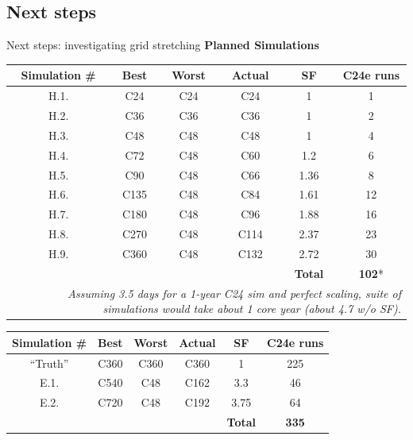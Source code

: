 \documentclass[10pt]{beamer}
\begin{document}
\subsection{Next steps}
\frame{\sectionpage}

\begin{frame}{Next steps: investigating grid stretching}
    \vspace{0.4cm}
    \footnotesize
    \textbf{Planned Simulations}
    \tiny
    \begin{table}[]
    \begin{tabular}{cccccc}
        \hline
        \textbf{Simulation \#} & \textbf{Best} & \textbf{Worst} &  \textbf{Actual} & \textbf{SF} & \textbf{C24e runs} \\ 
        \hline
        H.1. & C24 & C24 & C24 & 1 & 1  \\ 
        H.2. & C36 & C36 & C36 & 1 & 2  \\ 
        H.3. & C48 & C48 & C48 & 1 & 4  \\ 
        H.4. & C72 & C48 & C60 & 1.2 & 6  \\ 
        H.5. & C90 & C48 & C66 & 1.36 & 8  \\ 
        H.6. & C135 & C48 & C84 & 1.61 & 12  \\ 
        H.7. & C180 & C48 & C96 & 1.88 & 16  \\ 
        H.8. & C270 & C48 & C114 & 2.37 & 23  \\ 
        H.9. & C360 & C48 & C132 & 2.72 & 30  \\ 
        \hline
         &  &  & & \textbf{Total} & \textbf{102}*  \\ 
         \multicolumn{6}{r}{\fontsize{3}{3}\selectfont\textit{Assuming 3.5 days for a 1-year C24 sim and perfect scaling, suite of simulations would take about 1 core year (about 4.7 w/o SF).}} \\
    \end{tabular}
    \end{table}
    
    \tiny
    \begin{table}[]
    \begin{tabular}{cccccc}
        \hline
        \textbf{Simulation \#} & \textbf{Best} & \textbf{Worst} &  \textbf{Actual} & \textbf{SF} & \textbf{C24e runs} \\ 
        \hline
        ``Truth'' & C360 & C360 & C360 & 1 & 225  \\ 
        E.1. & C540 & C48 & C162 & 3.3 & 46  \\ 
        E.2. & C720 & C48 & C192 & 3.75 & 64  \\ 
        \hline
         &  &  & & \textbf{Total} & \textbf{335}  \\ 
    \end{tabular}
    \end{table}
    

\end{frame}
\end{document}
